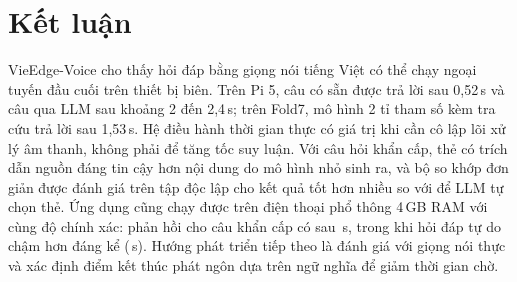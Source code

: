\documentclass[a4paper,12pt,twocolumn]{article}
\begin{document}
\section{Kết luận}
VieEdge-Voice cho thấy hỏi đáp bằng giọng nói tiếng Việt có thể chạy ngoại tuyến đầu cuối trên thiết bị biên. Trên Pi 5, câu có sẵn được trả lời sau 0,52\,s và câu qua LLM sau khoảng 2 đến 2,4\,s; trên Fold7, mô hình 2 tỉ tham số kèm tra cứu trả lời sau 1,53\,s. Hệ điều hành thời gian thực có giá trị khi cần cô lập lõi xử lý âm thanh, không phải để tăng tốc suy luận. Với câu hỏi khẩn cấp, thẻ có trích dẫn nguồn đáng tin cậy hơn nội dung do mô hình nhỏ sinh ra, và bộ so khớp đơn giản được đánh giá trên tập độc lập cho kết quả tốt hơn nhiều so với để LLM tự chọn thẻ. Ứng dụng cũng chạy được trên điện thoại phổ thông 4\,GB RAM với cùng độ chính xác: phản hồi cho câu khẩn cấp có sau \tclSafeMed\,s, trong khi hỏi đáp tự do chậm hơn đáng kể (\hmAnsT\,s). Hướng phát triển tiếp theo là đánh giá với giọng nói thực và xác định điểm kết thúc phát ngôn dựa trên ngữ nghĩa để giảm thời gian chờ.

\balance
\end{document}
